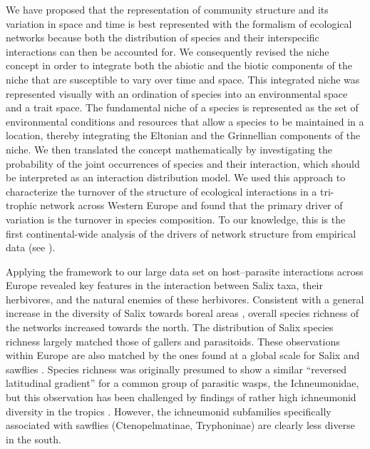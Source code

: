 \documentclass[12pt]{article}
\begin{document}
We have proposed that the representation of community structure and its variation
in space and time is best represented with the formalism of ecological
networks because both the distribution of species and their interspecific
interactions can then be accounted for. We consequently revised the niche concept in
order to integrate both the abiotic and the biotic components of the niche
that are susceptible to vary over time and space. This integrated niche was
represented visually with an ordination of species into an environmental space
and a trait space. The fundamental niche of a species is represented as the
set of environmental conditions and resources that allow a species to be
maintained in a location, thereby integrating the Eltonian and the Grinnellian
components of the niche. We then translated the concept mathematically by
investigating the probability of the joint occurrences of species and 
their interaction, which should be interpreted as an interaction distribution
model. We used this approach to characterize the turnover of the structure of
ecological interactions in a tri-trophic network across Western Europe and
found that the primary driver of variation is the turnover in species
composition. To our knowledge, this is the first continental-wide analysis of
the drivers of network structure from empirical data (see \citealt{Albouy2014,
Poisot2016}).

Applying the framework to our large data set on host–parasite interactions
across Europe revealed key features in the interaction between Salix taxa, their
herbivores, and the natural enemies of these herbivores. Consistent with a
general increase in the diversity of Salix towards boreal areas
\citep{Cronk2015}, overall species richness of the networks increased towards
the north. The distribution of Salix species richness largely matched those of
gallers and parasitoids. These observations within Europe are
also matched by the ones found at a global scale for Salix \citep{Argus1997,
Cronk2015, Wu2015} and sawflies \citep{Kouki1994, Kouki1999}. Species richness
was originally presumed to show a similar ``reversed latitudinal gradient'' for
a common group of parasitic wasps, the Ichneumonidae, but this observation
has been challenged by findings of rather high ichneumonid diversity in the
tropics \citep{Veijalainen2013}. However, the ichneumonid subfamilies
specifically associated with sawflies (Ctenopelmatinae, Tryphoninae) are
clearly less diverse in the south.
\end{document}
